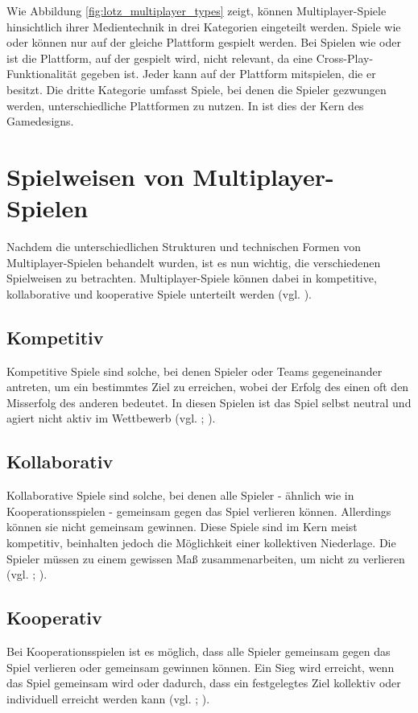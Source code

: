 Wie Abbildung \ref{fig:lotz_multiplayer_types} zeigt, können Multiplayer-Spiele hinsichtlich ihrer Medientechnik in drei Kategorien eingeteilt werden.
Spiele wie  oder  können nur auf der gleiche Plattform gespielt werden. Bei Spielen wie  oder  ist die Plattform, auf der gespielt wird, nicht relevant, da eine Cross-Play-Funktionalität gegeben ist. Jeder kann auf der Plattform mitspielen, die er besitzt. Die dritte Kategorie umfasst Spiele, bei denen die Spieler gezwungen werden, unterschiedliche Plattformen zu nutzen. In  ist dies der Kern des Gamedesigns.

\section{Spielweisen von Multiplayer-Spielen}
Nachdem die unterschiedlichen Strukturen und technischen Formen von Multiplayer-Spielen behandelt wurden, ist es nun wichtig, die verschiedenen Spielweisen zu betrachten. Multiplayer-Spiele können dabei in kompetitive, kollaborative und kooperative Spiele unterteilt werden (vgl. \citealp[S. 25f]{zagal_collaborative_2006}).

\subsection{Kompetitiv}
Kompetitive Spiele sind solche, bei denen Spieler oder Teams gegeneinander antreten, um ein bestimmtes Ziel zu erreichen, wobei der Erfolg des einen oft den Misserfolg des anderen bedeutet. In diesen Spielen ist das Spiel selbst neutral und agiert nicht aktiv im Wettbewerb (vgl. \citealp{noauthor_game_2014}; \citealp[S. 25]{zagal_collaborative_2006}).

\subsection{Kollaborativ}
Kollaborative Spiele sind solche, bei denen alle Spieler - ähnlich wie in Kooperationsspielen - gemeinsam gegen das Spiel verlieren können. Allerdings können sie nicht gemeinsam gewinnen. Diese Spiele sind im Kern meist kompetitiv, beinhalten jedoch die Möglichkeit einer kollektiven Niederlage. Die Spieler müssen zu einem gewissen Maß zusammenarbeiten, um nicht zu verlieren (vgl. \citealp{noauthor_game_2014};  \citealp[S. 25]{zagal_collaborative_2006}).

\subsection{Kooperativ}
Bei Kooperationsspielen ist es möglich, dass alle Spieler gemeinsam gegen das Spiel verlieren oder gemeinsam gewinnen können. Ein Sieg wird erreicht, wenn das Spiel gemeinsam  wird oder dadurch, dass ein festgelegtes Ziel kollektiv oder individuell erreicht werden kann (vgl. \citealp{noauthor_game_2014}; \citealp[S. 25]{zagal_collaborative_2006}).

